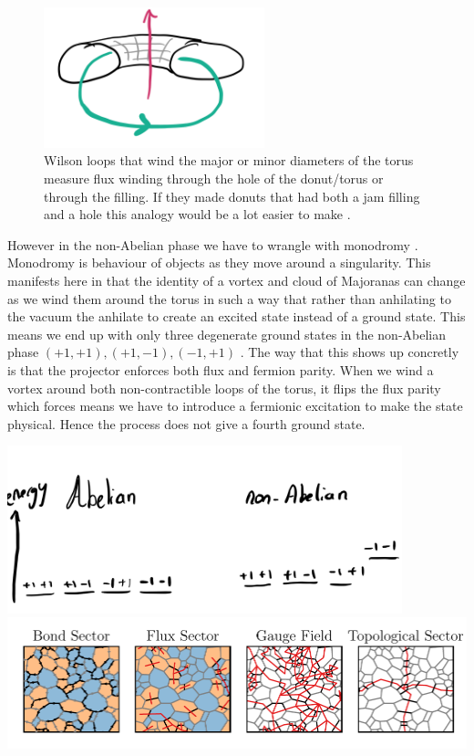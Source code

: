 \begin{figure}
\hypertarget{fig:topological_fluxes}{%
\centering
\includegraphics[width=0.57\textwidth,height=\textheight]{figure_code/amk_chapter/topological_fluxes.png}
\caption{Wilson loops that wind the major or minor diameters of the
torus measure flux winding through the hole of the donut/torus or
through the filling. If they made donuts that had both a jam filling and
a hole this analogy would be a lot easier to make
\textcite{parkerWhyDoesThis}.}\label{fig:topological_fluxes}
}
\end{figure}

However in the non-Abelian phase we have to wrangle with monodromy
\autocite{chungExplicitMonodromyMoore2007,oshikawaTopologicalDegeneracyNonAbelian2007}.
Monodromy is behaviour of objects as they move around a singularity.
This manifests here in that the identity of a vortex and cloud of
Majoranas can change as we wind them around the torus in such a way that
rather than anhilating to the vacuum the anhilate to create an excited
state instead of a ground state. This means we end up with only three
degenerate ground states in the non-Abelian phase
\((+1, +1), (+1, -1), (-1, +1)\)
\autocite[yaoAlgebraicSpinLiquid2009a]{chungTopologicalQuantumPhase2010}.
The way that this shows up concretly is that the projector enforces both
flux and fermion parity. When we wind a vortex around both
non-contractible loops of the torus, it flips the flux parity which
forces means we have to introduce a fermionic excitation to make the
state physical. Hence the process does not give a fourth ground state.

\includegraphics[width=0.86\textwidth,height=\textheight]{figure_code/amk_chapter/threefold_degeneracy.png}
\includegraphics[width=1.14\textwidth,height=\textheight]{figure_code/amk_chapter/state_decomposition_animated/state_decomposition_animated.pdf}


